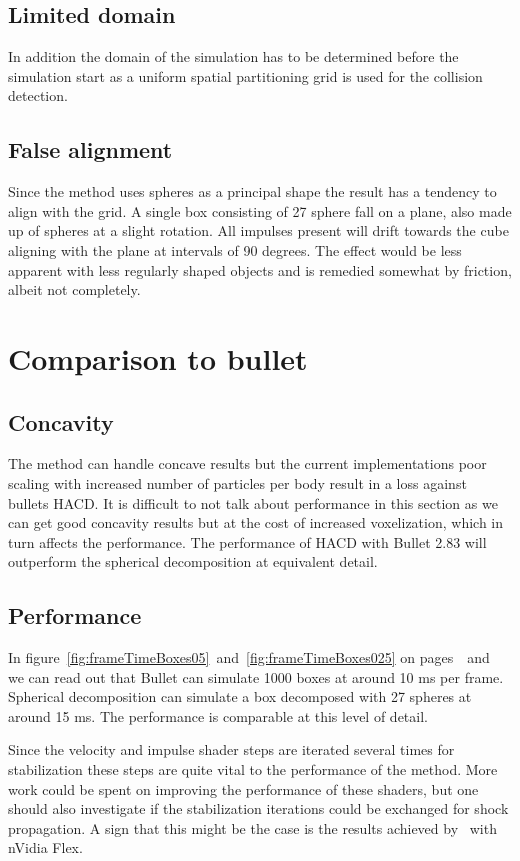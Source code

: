 \subsection{Limited domain}
In addition the domain of the simulation has to be determined before the simulation start
as a uniform spatial partitioning grid is used for the collision detection.

\subsection{False alignment}
Since the method uses spheres as a principal shape the result has a tendency to align
with the grid. A single box consisting of 27 sphere fall on a plane, also made up of spheres
at a slight rotation. All impulses present will drift towards the cube aligning with the
plane at intervals of 90 degrees. The effect would be less apparent with less regularly shaped objects and
is remedied somewhat by friction, albeit not completely.

\section{Comparison to bullet}
\subsection{Concavity}
The method can handle concave results but the current implementations poor scaling
with increased number of particles per body result in a loss against bullets HACD.
It is difficult to not talk about performance in this section as we can get good
concavity results but at the cost of increased voxelization, which in turn affects the
performance.
The performance of HACD with Bullet 2.83 will outperform the spherical decomposition
at equivalent detail.
\subsection{Performance}
In figure~\ref{fig:frameTimeBoxes05}~and~\ref{fig:frameTimeBoxes025}
on pages~\pageref{fig:frameTimeBoxes05}~and~\pageref{fig:frameTimeBoxes025}
we can read out that Bullet can simulate 1000 boxes at around 10 ms per frame.
Spherical decomposition can simulate a box decomposed with 27 spheres at around 15 ms.
The performance is comparable at this level of detail.

Since the velocity and impulse shader steps are iterated
several times for stabilization these steps are quite vital to the performance
of the method. More work could be spent on improving the performance of these shaders,
but one should also investigate if the stabilization iterations could be exchanged for
shock propagation. A sign that this might be the case is the results achieved by~\cite{flex} with nVidia Flex.

